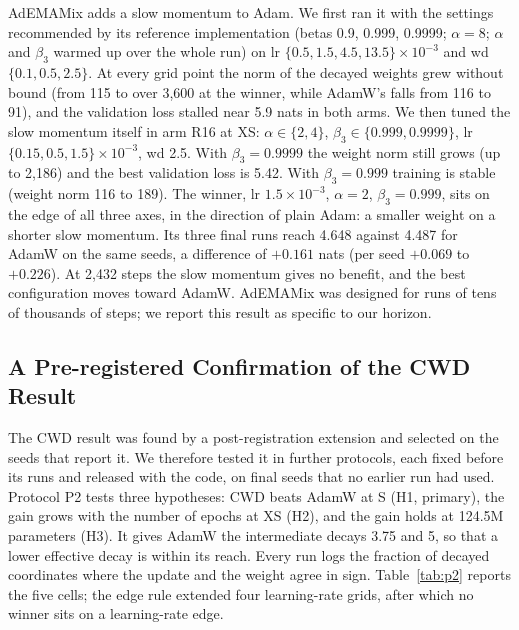 \documentclass[twoside,11pt]{article}
\begin{document}
AdEMAMix \citep{pagliardini2025ademamix} adds a slow momentum to Adam. We first ran it with the settings recommended by its reference implementation (betas 0.9, 0.999, 0.9999; $\alpha = 8$; $\alpha$ and $\beta_3$ warmed up over the whole run) on lr $\{0.5, 1.5, 4.5, 13.5\}\times10^{-3}$ and wd $\{0.1, 0.5, 2.5\}$. At every grid point the norm of the decayed weights grew without bound (from 115 to over 3,600 at the winner, while AdamW's falls from 116 to 91), and the validation loss stalled near 5.9 nats in both arms. We then tuned the slow momentum itself in arm R16 at XS: $\alpha \in \{2, 4\}$, $\beta_3 \in \{0.999, 0.9999\}$, lr $\{0.15, 0.5, 1.5\}\times10^{-3}$, wd 2.5. With $\beta_3 = 0.9999$ the weight norm still grows (up to 2,186) and the best validation loss is 5.42. With $\beta_3 = 0.999$ training is stable (weight norm 116 to 189). The winner, lr $1.5\times10^{-3}$, $\alpha = 2$, $\beta_3 = 0.999$, sits on the edge of all three axes, in the direction of plain Adam: a smaller weight on a shorter slow momentum. Its three final runs reach 4.648 against 4.487 for AdamW on the same seeds, a difference of $+0.161$ nats (per seed $+0.069$ to $+0.226$). At 2,432 steps the slow momentum gives no benefit, and the best configuration moves toward AdamW. AdEMAMix was designed for runs of tens of thousands of steps; we report this result as specific to our horizon.

\subsection{A Pre-registered Confirmation of the CWD Result}
\label{sec:p2}

The CWD result was found by a post-registration extension and selected on the seeds that report it. We therefore tested it in further protocols, each fixed before its runs and released with the code, on final seeds that no earlier run had used. Protocol P2 tests three hypotheses: CWD beats AdamW at S (H1, primary), the gain grows with the number of epochs at XS (H2), and the gain holds at 124.5M parameters (H3). It gives AdamW the intermediate decays 3.75 and 5, so that a lower effective decay is within its reach. Every run logs the fraction of decayed coordinates where the update and the weight agree in sign. Table~\ref{tab:p2} reports the five cells; the edge rule extended four learning-rate grids, after which no winner sits on a learning-rate edge.

\begin{table}[t]
\centering
\footnotesize
\resizebox{\textwidth}{!}{}
\caption{Protocol P2: CWD against AdamW on held-out seeds (2001--2006 at S, 2001--2003 at XS and M). Winners are given as lr, wd. Test loss means in nats; diff is the mean paired difference CWD $-$ AdamW with its $t$-based CI95, the bootstrap CI95 that the protocol registered, and the two-sided paired $t$-test.}
\label{tab:p2}
\end{table}
\end{document}
